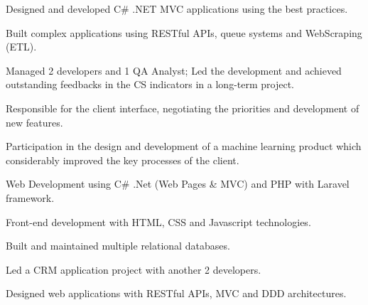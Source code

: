 \documentclass[]{deedy-resume-openfont}
\begin{document}
\begin{minipage}[t]{0.66\textwidth}
\begin{tightemize}
\item Designed and developed C\# .NET MVC applications using the best practices.
\item Built complex applications using RESTful APIs, queue systems and WebScraping (ETL).
\item Managed 2 developers and 1 QA Analyst; Led the development and achieved outstanding feedbacks in the CS indicators in a long-term project.
\item Responsible for the client interface, negotiating the priorities and development of new features.
\item Participation in the design and development of a machine learning product which considerably improved the key processes of the client. 
\end{tightemize}
\sectionsep

\begin{tightemize}
\item Web Development using C\# .Net (Web Pages \& MVC) and PHP with Laravel framework.
\item Front-end development with HTML, CSS and Javascript technologies.
\item Built and maintained multiple relational databases.
\item Led a CRM application project with another 2 developers.
\item Designed web applications with RESTful APIs, MVC and DDD architectures.
\end{tightemize}
\sectionsep





% 

\end{minipage} 
\end{document}
